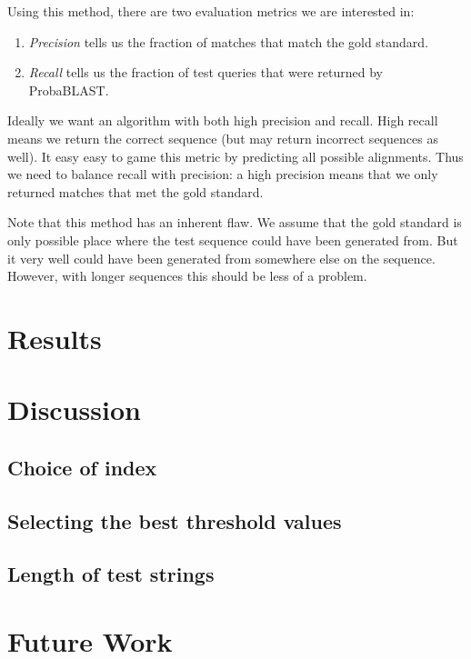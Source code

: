 \documentclass[10pt]{IEEEtran}
\begin{document}
Using this method, there are two evaluation metrics we are interested in:

\begin{enumerate}
\item \emph{Precision} tells us the fraction of matches that match the gold standard.
\item \emph{Recall} tells us the fraction of test queries that were returned by ProbaBLAST.
\end{enumerate}

Ideally we want an algorithm with both high precision and recall. High recall means we return the correct sequence (but may return incorrect sequences as well). It easy easy to game this metric by predicting all possible alignments. Thus we need to balance recall with precision: a high precision means that we only returned matches that met the gold standard.

Note that this method has an inherent flaw. We assume that the gold standard is only possible place where the test sequence could have been generated from. But it very well could have been generated from somewhere else on the sequence. However, with longer sequences this should be less of a problem.

\section{Results}
 
\section{Discussion}

\subsection{Choice of index}

\subsection{Selecting the best threshold values}

\subsection{Length of test strings}

\section{Future Work}
\end{document}
